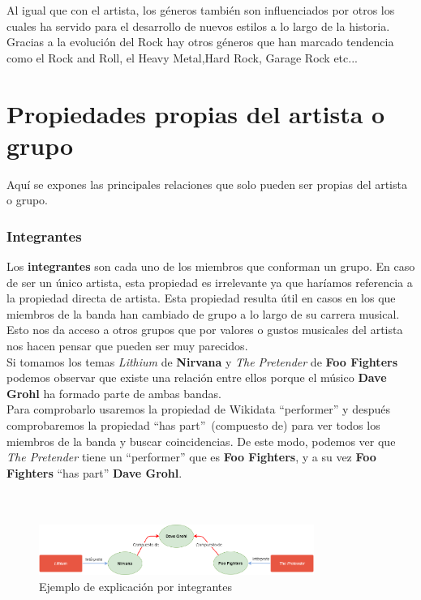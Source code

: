 Al igual que con el artista, los géneros también son influenciados por otros los cuales ha servido para el desarrollo de nuevos estilos a lo largo de la historia. Gracias a la evolución del Rock hay otros géneros que han marcado tendencia como el Rock and Roll, el Heavy Metal,Hard Rock, Garage Rock etc...\\

\section{Propiedades propias del artista o grupo}

Aquí se expones las principales relaciones que solo pueden ser propias del artista o grupo.\\

\subsubsection*{Integrantes}

Los \textbf{integrantes} son cada uno de los miembros que conforman un grupo. En caso de ser un único artista, esta propiedad es irrelevante ya que haríamos referencia a la propiedad directa de artista. Esta propiedad resulta útil en casos en los que miembros de la banda han cambiado de grupo a lo largo de su carrera musical. Esto nos da acceso a otros grupos que por valores o gustos musicales del artista nos hacen pensar que pueden ser muy parecidos.\\

Si tomamos los temas \textit{Lithium} de \textbf{Nirvana} y \textit{The Pretender} de \textbf{Foo Fighters} podemos observar que existe una relación entre ellos porque el músico \textbf{Dave Grohl} ha formado parte de ambas bandas.\\

Para comprobarlo usaremos la propiedad de Wikidata ``performer'' y después comprobaremos la propiedad ``has part''~(compuesto de) para ver todos los miembros de la banda y buscar coincidencias. De este modo, podemos ver que \textit{The Pretender} tiene un ``performer'' que es \textbf{Foo Fighters}, y a su vez \textbf{Foo Fighters} ``has part'' \textbf{Dave Grohl}.\\\\\\

\begin{figure}[h!]
	\centering
	\includegraphics[width = 0.8\textwidth]{Imagenes/Bitmap/Integrante ejemplo.png}
	\caption{Ejemplo de explicación por integrantes}
	\label{fig:sampleImage}
\end{figure}


